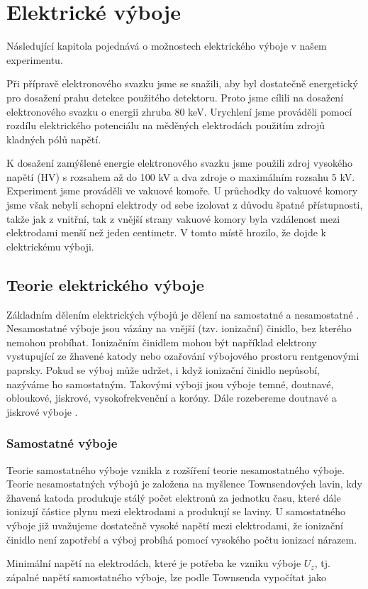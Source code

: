 \newpage

\chapter{Elektrické výboje}
\par Následující kapitola pojednává o možnostech elektrického výboje v našem experimentu.
\par Při přípravě elektronového svazku jsme se snažili, aby byl dostatečně energetický pro dosažení prahu detekce použitého detektoru. Proto jsme cílili na dosažení elektronového svazku o energii zhruba 80 keV. Urychlení jsme prováděli pomocí rozdílu elektrického potenciálu na měděných elektrodách použitím zdrojů kladných pólů napětí. 
\par K dosažení zamýšlené energie elektronového svazku jsme použili zdroj vysokého napětí (HV) s rozsahem až do 100 kV a dva zdroje o maximálním rozsahu 5 kV. Experiment jsme prováděli ve vakuové komoře. U průchodky do vakuové komory jsme však nebyli schopni elektrody od sebe izolovat z důvodu špatné přístupnosti, takže jak z vnitřní, tak z vnější strany vakuové komory byla vzdálenost mezi elektrodami menší než jeden centimetr. V tomto místě hrozilo, že dojde k elektrickému výboji.

\section{Teorie elektrického výboje}
\par Základním dělením elektrických výbojů je dělení na samostatné a nesamostatné \cite{kracik}. Nesamostatné výboje jsou vázány na vnější (tzv. ionizační) činidlo, bez kterého nemohou probíhat. Ionizačním činidlem mohou být například elektrony vystupující ze žhavené katody nebo ozařování výbojového prostoru rentgenovými paprsky. Pokud se výboj může udržet, i když ionizační činidlo nepůsobí, nazýváme ho samostatným. Takovými výboji jsou výboje temné, doutnavé, obloukové, jiskrové, vysokofrekvenční a koróny. Dále rozebereme doutnavé a jiskrové výboje \cite{kracik}.

\subsection{Samostatné výboje}
\par Teorie samostatného výboje vznikla z rozšíření teorie nesamostatného výboje. Teorie nesamostatných výbojů je založena na myšlence Townsendových lavin, kdy žhavená katoda produkuje stálý počet elektronů za jednotku času, které dále ionizují částice plynu mezi elektrodami a produkují se laviny. U samostatného výboje již uvažujeme dostatečně vysoké napětí mezi elektrodami, že ionizační činidlo není zapotřebí a výboj probíhá pomocí vysokého počtu ionizací nárazem.
\par Minimální napětí na elektrodách, které je potřeba ke vzniku výboje $U_z$, tj. zápalné napětí samostatného výboje, lze podle Townsenda vypočítat jako \cite{kracik}

